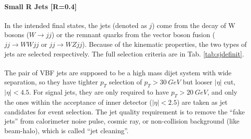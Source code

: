 \noindent
\\{\bf Small R Jets [R=0.4]}
\\
\\In the intended final states, the jets (denoted as $j$) come from the decay of W bosons ($W\to jj$) or the remnant quarks from the vector boson fusion ($jj\to WWjj$ or $jj \to WZjj$). Because of the kinematic properties, the two types of jets are selected respectively. The full selection criteria are in Tab. \ref{tab:sjdefinit}.
\\
\\The pair of VBF jets are supposed to be a high mass dijet system with wide separation, so they have tighter $p_{T}$ selection of $p_{T}>30~GeV$ but looser $|\eta|$ cut, $|\eta|<4.5$. For signal jets, they are only required to have $p_{T}>20~GeV$, and only the ones within the acceptance of inner detector ($|\eta|<2.5$) are taken as jet candidates for event selection. The jet quality requirement is to remove the ``fake jets'' from calorimeter noise pulse, cosmic ray, or non-collision background (like beam-halo), which is called ``jet cleaning''.

